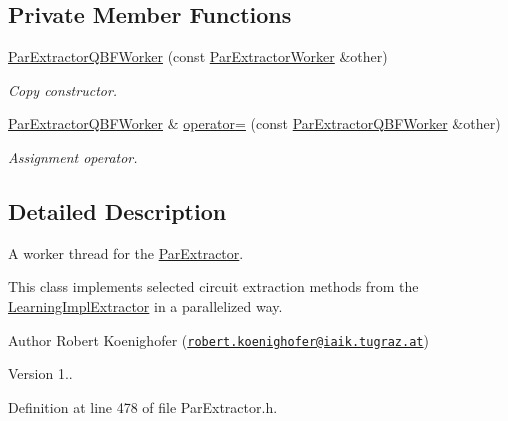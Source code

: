 \subsection*{Private Member Functions}
\begin{DoxyCompactItemize}
\item 
\hyperlink{classParExtractorQBFWorker_adea08577bcf797c9018dbf6b3d50d9d6}{Par\-Extractor\-Q\-B\-F\-Worker} (const \hyperlink{classParExtractorWorker}{Par\-Extractor\-Worker} \&other)
\begin{DoxyCompactList}\small\item\em Copy constructor. \end{DoxyCompactList}\item 
\hyperlink{classParExtractorQBFWorker}{Par\-Extractor\-Q\-B\-F\-Worker} \& \hyperlink{classParExtractorQBFWorker_a265618b36805fb9a8528f607721b0713}{operator=} (const \hyperlink{classParExtractorQBFWorker}{Par\-Extractor\-Q\-B\-F\-Worker} \&other)
\begin{DoxyCompactList}\small\item\em Assignment operator. \end{DoxyCompactList}\end{DoxyCompactItemize}


\subsection{Detailed Description}
A worker thread for the \hyperlink{classParExtractor}{Par\-Extractor}. 

This class implements selected circuit extraction methods from the \hyperlink{classLearningImplExtractor}{Learning\-Impl\-Extractor} in a parallelized way.

\begin{DoxyAuthor}{Author}
Robert Koenighofer (\href{mailto:robert.koenighofer@iaik.tugraz.at}{\tt robert.\-koenighofer@iaik.\-tugraz.\-at}) 
\end{DoxyAuthor}
\begin{DoxyVersion}{Version}
1.. 
\end{DoxyVersion}


Definition at line 478 of file Par\-Extractor.\-h.



